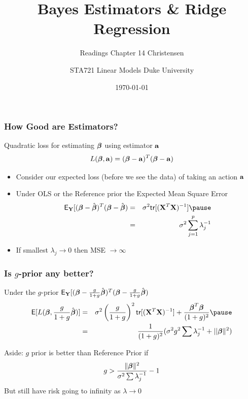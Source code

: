 \documentclass[handout]{beamer}
\title{Bayes Estimators \& Ridge Regression}
\subtitle{Readings Chapter 14 Christensen}
\institute{Merlise Clyde}
\author{STA721 Linear Models Duke University}
\date{\today}
\begin{document}
\maketitle


\begin{frame}
  \frametitle{How Good are  Estimators?}
Quadratic loss for estimating  $\boldsymbol{\beta}$ using estimator $\mathbf{a}$
$$ L(\boldsymbol{\beta}, \mathbf{a}) =  ( \boldsymbol{\beta} - \mathbf{a})^T(\boldsymbol{\beta} -\mathbf{a})$$ \pause

\begin{itemize}
\item Consider our expected loss (before we see the data) of taking an
action $\mathbf{a}$ \pause
\item Under OLS or the  Reference prior the Expected Mean Square Error  \pause
  \begin{eqnarray*}
\E_\Y[( \b - \bhat)^T(\b -\bhat) & = &\sigma^2
  \tr[(\X^T\X)^{-1}] \pause \\
 & = & \sigma^2 \sum_{j=1}^p \lambda_j^{-1}
  \end{eqnarray*}
\pause
\item If smallest $\lambda_j \to 0$ then MSE $\to \infty$
\end{itemize}
\end{frame}


  \begin{frame}
 \frametitle{Is $g$-prior any better? }  

Under the $g$-prior $\textsf{E}_{\mathbf{Y}}[( \boldsymbol{\beta} - \frac{g}{1+g}\hat{\boldsymbol{\beta}})^T(\boldsymbol{\beta}
-\frac{g}{1+g}\hat{\boldsymbol{\beta}}) $ \pause
  \begin{eqnarray*}
\E[L(\b, \frac{g}{1+g}\bhat)]  & = &
\sigma^2 \left(\frac{g}{1+g}   \right)^2  \tr[(\X^T\X)^{-1}]  +
\frac{\b^T\b}{(1 + g)^2} \pause \\
&  =  & \frac{1}{(1 + g)^2} (\sigma^2 g^2 \sum \lambda_j^{-1}  + ||\b\|^2)
  \end{eqnarray*} \pause


Aside: $g$ prior is better than Reference Prior if 
$$g > \frac{ \| \boldsymbol{\beta}\|^2 }{\sigma^2 \sum \lambda_j^{-1 }} -1$$
But still have risk going to infinity as $\lambda \to 0$
\end{frame}
\end{document}
